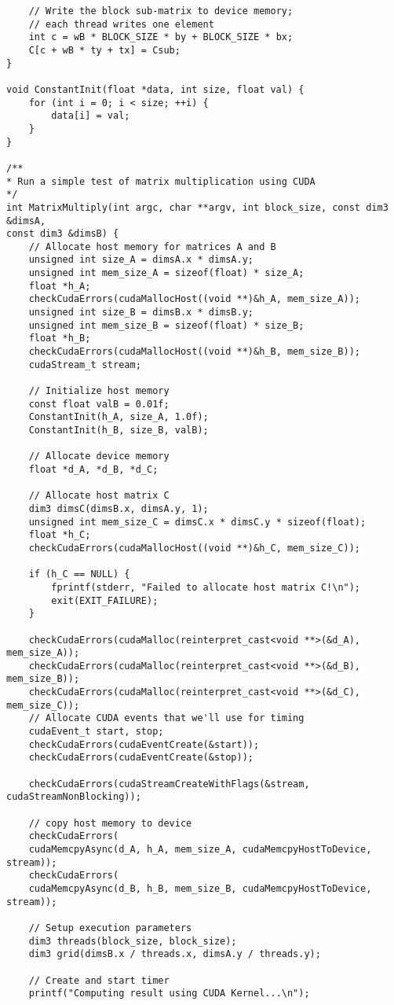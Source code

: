 \begin{lstlisting}
	// Write the block sub-matrix to device memory;
	// each thread writes one element
	int c = wB * BLOCK_SIZE * by + BLOCK_SIZE * bx;
	C[c + wB * ty + tx] = Csub;
}

void ConstantInit(float *data, int size, float val) {
	for (int i = 0; i < size; ++i) {
		data[i] = val;
	}
}

/**
* Run a simple test of matrix multiplication using CUDA
*/
int MatrixMultiply(int argc, char **argv, int block_size, const dim3 &dimsA,
const dim3 &dimsB) {
	// Allocate host memory for matrices A and B
	unsigned int size_A = dimsA.x * dimsA.y;
	unsigned int mem_size_A = sizeof(float) * size_A;
	float *h_A;
	checkCudaErrors(cudaMallocHost((void **)&h_A, mem_size_A));
	unsigned int size_B = dimsB.x * dimsB.y;
	unsigned int mem_size_B = sizeof(float) * size_B;
	float *h_B;
	checkCudaErrors(cudaMallocHost((void **)&h_B, mem_size_B));
	cudaStream_t stream;
	
	// Initialize host memory
	const float valB = 0.01f;
	ConstantInit(h_A, size_A, 1.0f);
	ConstantInit(h_B, size_B, valB);
	
	// Allocate device memory
	float *d_A, *d_B, *d_C;
	
	// Allocate host matrix C
	dim3 dimsC(dimsB.x, dimsA.y, 1);
	unsigned int mem_size_C = dimsC.x * dimsC.y * sizeof(float);
	float *h_C;
	checkCudaErrors(cudaMallocHost((void **)&h_C, mem_size_C));
	
	if (h_C == NULL) {
		fprintf(stderr, "Failed to allocate host matrix C!\n");
		exit(EXIT_FAILURE);
	}
	
	checkCudaErrors(cudaMalloc(reinterpret_cast<void **>(&d_A), mem_size_A));
	checkCudaErrors(cudaMalloc(reinterpret_cast<void **>(&d_B), mem_size_B));
	checkCudaErrors(cudaMalloc(reinterpret_cast<void **>(&d_C), mem_size_C));
	// Allocate CUDA events that we'll use for timing
	cudaEvent_t start, stop;
	checkCudaErrors(cudaEventCreate(&start));
	checkCudaErrors(cudaEventCreate(&stop));
	
	checkCudaErrors(cudaStreamCreateWithFlags(&stream, cudaStreamNonBlocking));
	
	// copy host memory to device
	checkCudaErrors(
	cudaMemcpyAsync(d_A, h_A, mem_size_A, cudaMemcpyHostToDevice, stream));
	checkCudaErrors(
	cudaMemcpyAsync(d_B, h_B, mem_size_B, cudaMemcpyHostToDevice, stream));
	
	// Setup execution parameters
	dim3 threads(block_size, block_size);
	dim3 grid(dimsB.x / threads.x, dimsA.y / threads.y);
	
	// Create and start timer
	printf("Computing result using CUDA Kernel...\n");
	

\end{lstlisting}
